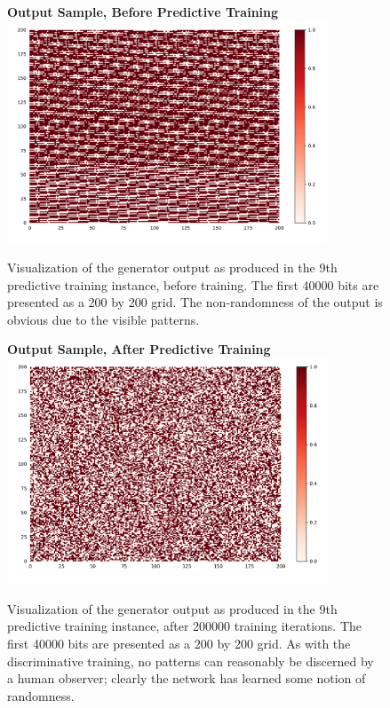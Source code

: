 \documentclass[12pt, titlepage]{report}
\theoremstyle{definition}
\begin{document}
    \begin{figure}
    \centering
    \textbf{Output Sample, Before Predictive Training}
    \includegraphics[width=0.85\textwidth]{img/predictive_before}\\
    \caption{Visualization of the generator output as produced in the 9th predictive training instance, before training. The first 40000 bits are presented as a 200 by 200 grid. The non-randomness of the output is obvious due to the visible patterns.}
    \label{figure:visualize_predictive_before}
    \end{figure}
    
    \begin{figure}
    \centering
    \textbf{Output Sample, After Predictive Training}
    \includegraphics[width=0.85\textwidth]{img/predictive_after}\\
    \caption{Visualization of the generator output as produced in the 9th predictive training instance, after 200000 training iterations. The first 40000 bits are presented as a 200 by 200 grid. As with the discriminative training, no patterns can reasonably be discerned by a human observer; clearly the network has learned some notion of randomness.}
    \label{figure:visualize_predictive_after}
    \end{figure}
\end{document}
